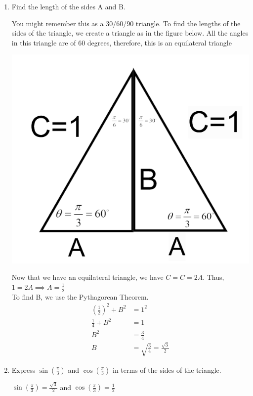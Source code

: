 \documentclass[nooutcomes]{ximera}
\begin{document}
\begin{problem}
\begin{enumerate}
		\begin{enumerate}
	\item Find the length of the sides A and B.
	\begin{freeResponse}
	You might remember this as a 30/60/90 triangle.  To find the lengths of the sides of the triangle, we create a triangle as in the figure below.  All the angles in this triangle are of 60 degrees, therefore, this is an equilateral triangle 
		\begin{image}
		\includegraphics[scale=.5]{figure4.png}
		\end{image}
	Now that we have an equilateral triangle, we have $C=C=2A$.  Thus, $1=2A \implies A=\frac{1}{2}$ \\
	To find B, we use the Pythagorean Theorem.
	\begin{align*}
	\left(\frac{1}{2}\right)^2+B^2&=1^2\\
	\frac{1}{4}+B^2&=1 \\ 	
	B^2&=\frac{3}{4}\\
	B&=\sqrt{\frac{3}{4}}=\frac{\sqrt{3}}{2}
	\end{align*}
	\end{freeResponse}

	\item Express $\sin\left(\frac{\pi}{3}\right)$ and $\cos\left(\frac{\pi}{3}\right)$ in terms of the sides of the triangle.

	\begin{freeResponse}
	$\sin\left(\frac{\pi}{3}\right)=\frac{\sqrt{3}}{2}$ and $\cos\left(\frac{\pi}{3}\right)=\frac{1}{2}$


\end{freeResponse}
\end{enumerate}
\end{enumerate}
\end{problem}
\end{document}
